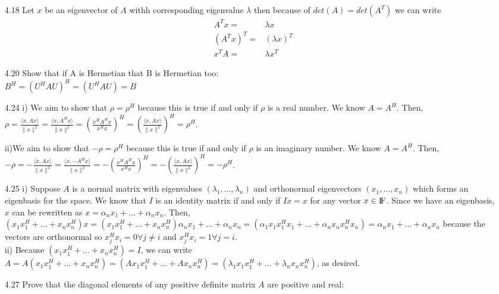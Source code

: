 \documentclass[letterpaper,12pt]{article}
\theoremstyle{definition}
\begin{document}
\begin{enumerate}
\item[4.18]
Let $x$ be an eigenvector of $A$ withh corresponding eigenvalue $\lambda$ then because of $det(A)=det(A^T)$ we can write
\begin{align*} 
A^Tx=& \lambda x\\
(A^Tx)^T=& (\lambda x)^T\\
x^TA=& \lambda x^T
\end{align*}

\item[4.20] Show that if A is Hermetian that B is Hermetian too:\\
$B^H = (U^HAU)^H = (U^HAU) = B $

\item[4.24] i) We aim to show that $\rho = \rho^{H}$ because this is true if and only if $\rho$ is a real number. We know $A = A^{H}$. Then,  $\rho = \frac{\langle x,Ax \rangle}{\|x\|^{2}} = \frac{\langle x, A^{H}x \rangle}{\|x\|^{2}} = (\frac{x^{H}A^{H}x}{x^{H}x})^{H} = (\frac{\langle x, Ax \rangle}{\|x\|^{2}})^{H} = \rho^{H}$.

ii)We aim to show that $-\rho = \rho^{H}$ because this is true if and only if $\rho$ is an imaginary number. We know $A = A^{H}$. Then,  $-\rho = -\frac{\langle x,Ax \rangle}{\|x\|^{2}} = \frac{\langle x, -A^{H}x \rangle}{\|x\|^{2}} = -(\frac{x^{H}A^{H}x}{x^{H}x})^{H} = -(\frac{\langle x, Ax \rangle}{\|x\|^{2}})^{H} = -\rho^{H}$. \\

\item[4.25]i) Suppose $A$ is a normal matrix with eigenvalues $(\lambda_{1}, ... , \lambda_{n})$ and orthonormal eigenvectors $(x_{1}, ..., x_{n})$ which forms an eigenbasis for the space. We know that $I$ is an identity matrix if and only if $Ix = x$ for any vector $x \in {\rm I\!F}$. Since we have an eigenbasis, $x$ can be rewritten as $x = \alpha_{n}x_{1}+ ...+\alpha_{n}x_{n}$.  Then, $(x_{1}x_{1}^{H} + ... + x_{n}x_{n}^{H})x = (x_{1}x_{1}^{H} + ... + x_{n}x_{n}^{H})\alpha_{n}x_{1}+ ...+\alpha_{n}x_{n} = (\alpha_{1}x_{1}x_{1}^{H}x_{1} + ... + \alpha_{n}x_{n}x_{n}^{H}x_{n}) =  \alpha_{n}x_{1}+ ...+\alpha_{n}x_{n}$ because the vectors are orthonormal so $x_{j}^{H}x_{i} = 0 \forall j \neq i$ and $x_{j}^{H}x_{i} = 1 \forall j = i$. \\

ii) Because $(x_{1}x_{1}^{H} + ... + x_{n}x_{n}^{H}) = I$, we can write $A = A(x_{1}x_{1}^{H} + ... + x_{n}x_{n}^{H}) = (Ax_{1}x_{1}^{H} + ... + Ax_{n}x_{n}^{H}) = (\lambda_{1}x_{1}x_{1}^{H} + ... + \lambda_{n}x_{n}x_{n}^{H})$, as desired. \\
\item[4.27] Prove that the diagonal elements of any positive definite matrix $A$ are positive and real:


\end{enumerate}
\end{document}
